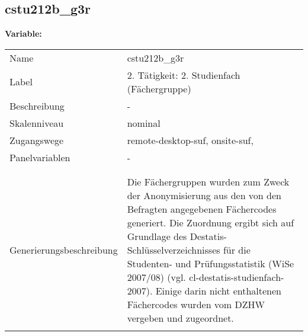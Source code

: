 	
	
	\subsection{cstu212b\_g3r}
	\label{subSection:cstu212b_g3r}

	\noindent\textbf{Variable:}\\
		\begin{tabular}{lL{11.3cm}}
			\label{tableVariable:cstu212b_g3r}
			Name & cstu212b\_g3r \\
			Label & 2. Tätigkeit: 2. Studienfach (Fächergruppe) \\
			Beschreibung & - \\
			Skalenniveau & nominal \\
			Zugangswege &
				remote-desktop-suf,
				onsite-suf,
 \\
			Panelvariablen & -
			 \\
			 \\
 \\
					Generierungsbeschreibung & Die Fächergruppen wurden zum Zweck der Anonymisierung aus den von den Befragten angegebenen Fächercodes generiert. Die Zuordnung ergibt sich auf Grundlage des Destatis-Schlüsselverzeichnisses für die Studenten- und Prüfungsstatistik (WiSe 2007/08) (vgl. cl-destatis-studienfach-2007). Einige darin nicht enthaltenen Fächercodes wurden vom DZHW vergeben und zugeordnet. 
				 \\	
			 \\
		\end{tabular}






